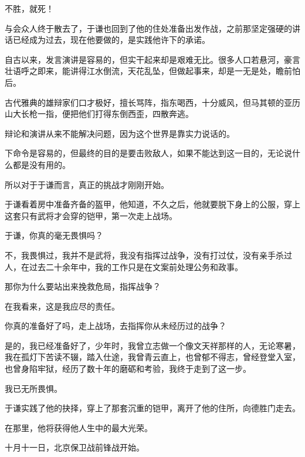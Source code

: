 \begin{multicols}{\theparacolNo}
不胜，就死！

与会众人终于散去了，于谦也回到了他的住处准备出发作战，之前那坚定强硬的讲话已经成为过去，现在他要做的，是实践他许下的承诺。

自古以来，发言演讲是容易的，但实干起来却是艰难无比。很多人口若悬河，豪言壮语呼之即来，能讲得江水倒流，天花乱坠，但做起事来，却是一无是处，瞻前怕后。

古代雅典的雄辩家们口才极好，擅长骂阵，指东喝西，十分威风，但马其顿的亚历山大长枪一指，便把他们打得东倒西歪，四散奔逃。

辩论和演讲从来不能解决问题，因为这个世界是靠实力说话的。

下命令是容易的，但最终的目的是要击败敌人，如果不能达到这一目的，无论说什么都是没有用的。

所以对于于谦而言，真正的挑战才刚刚开始。

于谦看着房中准备齐备的盔甲，他知道，不久之后，他就要脱下身上的公服，穿上这套只有武将才会穿的铠甲，第一次走上战场。

于谦，你真的毫无畏惧吗？

不，我畏惧过，我并不是武将，我没有指挥过战争，没有打过仗，没有亲手杀过人，在过去二十余年中，我的工作只是在文案前处理公务和政事。

那你为什么要站出来挽救危局，指挥战争？

在我看来，这是我应尽的责任。

你真的准备好了吗，走上战场，去指挥你从未经历过的战争？

是的，我已经准备好了，少年时，我曾立志做一个像文天祥那样的人，无论寒暑，我在孤灯下苦读不辍，踏入仕途，我曾青云直上，也曾郁不得志，曾经登堂入室，也曾身陷牢狱，经历了数十年的磨砺和考验，我终于走到了这一步。

我已无所畏惧。

于谦实践了他的抉择，穿上了那套沉重的铠甲，离开了他的住所，向德胜门走去。

在那里，他将获得他人生中的最大光荣。

十月十一日，北京保卫战前锋战开始。
\ifnum{}
	\end{multicols}
\fi
\newpage
